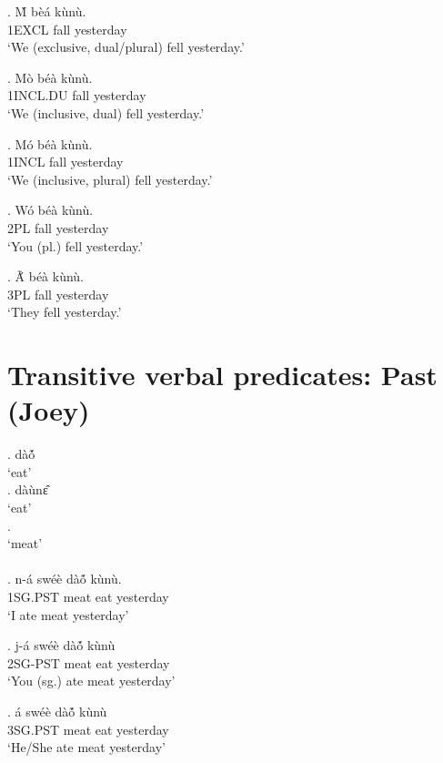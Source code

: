 \documentclass{assets/fieldnotes}
\begin{document}
{\exg. \`{M} b\`{e}\'{a} k\`{u}n\`{u}. \\
1EXCL fall yesterday \\
`We (exclusive, dual/plural) fell yesterday.'

\exg. M\`{o} b\'{e}\`{a} k\`{u}n\`{u}. \\
1INCL.DU fall yesterday \\
`We (inclusive, dual) fell yesterday.'

\exg. M\'{o} b\'{e}\`{a} k\`{u}n\`{u}. \\
1INCL fall yesterday \\
`We (inclusive, plural) fell yesterday.'

\exg. W\'{o} b\'{e}\`{a} k\`{u}n\`{u}. \\
2PL fall yesterday \\
`You (pl.) fell yesterday.'

\exg. Ã́ b\'{e}\`{a} k\`{u}n\`{u}. \\
3PL fall yesterday \\
`They fell yesterday.' 

\section{Transitive verbal predicates: Past (Joey)} 

\ex. dàó̃\\
    `eat'\\

\ex. dàùnɛ̂\\
    `eat'\\


\exg.  \\
`meat'\\
  

\\

\exg. n-á swéè dàó̃ kùnù.\\
1SG.PST meat eat yesterday \\%
    `I ate meat yesterday'

\exg. j-á swéè dàó̃ kùnù\\
2SG-PST meat eat yesterday \\%
    `You (sg.) ate meat yesterday'

\exg. á swéè dàó̃ kùnù\\
3SG.PST meat eat yesterday \\%
    `He/She ate meat yesterday'

}
\end{document}
